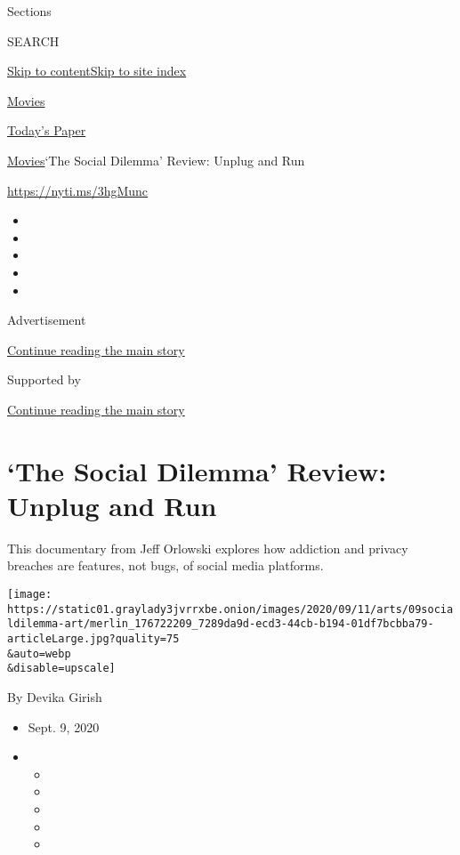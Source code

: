 Sections

SEARCH

\protect\hyperlink{site-content}{Skip to
content}\protect\hyperlink{site-index}{Skip to site index}

\href{https://www.nytimes3xbfgragh.onion/section/movies}{Movies}

\href{https://myaccount.nytimes3xbfgragh.onion/auth/login?response_type=cookie\&client_id=vi}{}

\href{https://www.nytimes3xbfgragh.onion/section/todayspaper}{Today's
Paper}

\href{/section/movies}{Movies}\textbar{}`The Social Dilemma' Review:
Unplug and Run

\url{https://nyti.ms/3hgMunc}

\begin{itemize}
\item
\item
\item
\item
\item
\end{itemize}

Advertisement

\protect\hyperlink{after-top}{Continue reading the main story}

Supported by

\protect\hyperlink{after-sponsor}{Continue reading the main story}

\hypertarget{the-social-dilemma-review-unplug-and-run}{%
\section{`The Social Dilemma' Review: Unplug and
Run}\label{the-social-dilemma-review-unplug-and-run}}

This documentary from Jeff Orlowski explores how addiction and privacy
breaches are features, not bugs, of social media platforms.

\texttt{[image: https://static01.graylady3jvrrxbe.onion/images/2020/09/11/arts/09socialdilemma-art/merlin\_176722209\_7289da9d-ecd3-44cb-b194-01df7bcbba79-articleLarge.jpg?quality=75\\\&auto=webp\\\&disable=upscale]}

By Devika Girish

\begin{itemize}
\item
  Sept. 9, 2020
\item
  \begin{itemize}
  \item
  \item
  \item
  \item
  \item
  \end{itemize}
\end{itemize}

